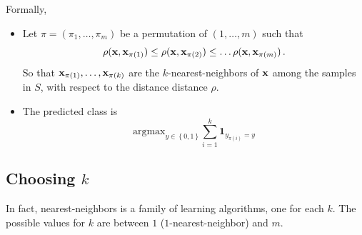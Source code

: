 Formally, 
\begin{itemize}
  \item Let $\pi = (\pi_1,\ldots,\pi_m)$ be a permutation of $(1,\ldots,m)$ such
    that \[\rho(\mathbf{x},\mathbf{x}_{\pi(1)}) \leq \rho(\mathbf{x},\mathbf{x}_{\pi(2)}) \leq
    \ldots \rho(\mathbf{x},\mathbf{x}_{\pi(m)})\,.\]
    So that $\mathbf{x}_{\pi(1)} ,\ldots,\mathbf{x}_{\pi(k)}$ are the
    $k$-nearest-neighbors of $\mathbf{x}$ among the samples in $S$, with respect to
    the distance distance $\rho$. 
  \item The predicted class is 
    \[
      \text{argmax}_{y\in\left\{ 0,1 \right\}}
    \sum_{ i=1}^k\mathbf{1}_{y_{\pi(i)}=y}
    \]
\end{itemize}

\subsection{Choosing $k$}
In fact, nearest-neighbors is a family
of learning algorithms, one for each $k$. 
The possible values
for $k$ are between $1$ ($1$-nearest-neighbor) and $m$. 

